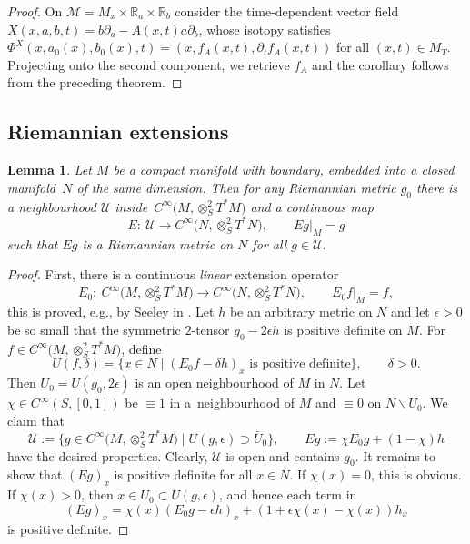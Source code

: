 \documentclass[pdftex]{sigma}
\numberwithin{equation}{section}
\newtheorem{Lemma}[Theorem]{Lemma}
\theoremstyle{definition}
\newcommand{\R}{\mathbb{R}} %
\newcommand{\1}{{\bf 1}}
\begin{document}
\begin{proof}
	On $\mathcal M = M_x \times \R_a\times \R_b$ consider the time-dependent vector field $X(x,a,b,t)={b \partial_a - A(x,t)a \partial_b}$, whose isotopy satisfies $\Phi^X(x,a_0(x),b_0(x),t)=(x,f_A(x,t),\partial_t f_A(x,t))$ for all ${(x,t)\in M_T}$. Projecting onto the second component, we retrieve $f_A$ and the corollary follows from the preceding theorem.
\end{proof}


\subsection{Riemannian extensions}

\begin{Lemma}\label{lem_rext}
Let $M$ be a compact manifold with boundary, embedded into a closed manifold~$N$ of the same dimension. Then for any Riemannian metric $g_0$ there is a neighbourhood $\mathcal U$ inside~$C^\infty\bigl(M,\otimes^2_ST^*M\bigr)$ and a continuous map
\[
	E\colon\ \mathcal U \rightarrow C^\infty\bigl(N,\otimes^2_ST^*N\bigr), \qquad Eg|_{M}=g
\]
such that $Eg$ is a Riemannian metric on $N$ for all $g\in \mathcal U$.
\end{Lemma}

 \begin{proof} First, there is a continuous {\it linear} extension operator
\begin{equation*}
E_0\colon\ C^\infty\bigl(M,\otimes_S^2T^*M\bigr)\rightarrow C^\infty\bigl(N,\otimes_S^2T^*N\bigr),\qquad E_0f\vert_M = f,
\end{equation*}
this is proved, e.g., by Seeley in \cite{See64}. Let $h$ be an arbitrary metric on $N$ and let $\epsilon>0$ be so small that the symmetric $2$-tensor $g_0 - 2\epsilon h$ is positive definite on $M$. For $f\in C^\infty\bigl(M,\otimes_S^2T^*M\bigr)$, define
\begin{equation*}
U(f,\delta) =\{x\in N\mid (E_0f-\delta h)_x \text{ is positive definite}\}, \qquad \delta>0.
\end{equation*}
Then $U_0=U(g_0,2\epsilon)$ is an open neighbourhood of $M$ in $N$. Let $\chi\in C^\infty(S,[0,1])$ be $\equiv 1$ in a~neighbourhood of $M$ and $\equiv 0$ on $N\backslash U_0$. We claim that
\[
\mathcal U :=\bigl\{g\in C^\infty\bigl(M,\otimes^2_S T^*M\bigr)\mid U(g,\epsilon)\supset \bar U_0\bigr\},\qquad Eg := \chi E_0g + (1-\chi)h
\]
have the desired properties. Clearly, $\mathcal U$ is open and contains $g_0$. It remains to show that $(Eg)_x$ is positive definite for all $x\in N$. If $\chi(x)=0$, this is obvious. If $\chi(x)>0$, then $x\in \bar U_0\subset U(g,\epsilon)$, and hence each term in
\begin{equation*}
(Eg)_x = \chi(x)(E_0g-\epsilon h)_x + (1+\epsilon \chi(x) - \chi(x))h_x
\end{equation*}
is positive definite.
\end{proof}
\end{document}
